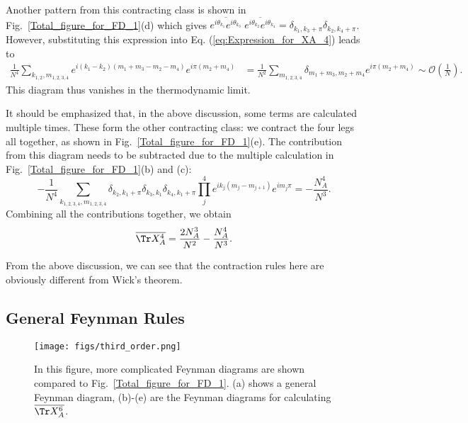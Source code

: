 Another pattern from this contracting class is shown in Fig.~\ref{Total_figure_for_FD_1}(d)
which gives $\overline{e^{i\theta_{k_{1}}}e^{i\theta_{k_{3}}}}\;\overline{e^{i\theta_{k_{2}}}e^{i\theta_{k_{4}}}}=\delta_{k_{1},k_{3}+\pi}\delta_{k_{2},k_{4}+\pi}$.
However, substituting this expression into Eq. (\ref{eq:Expression_for_XA_4})
leads to
\begin{equation}
\begin{aligned}\frac{1}{N^{4}}\sum_{k_{1,2},m_{1,2,3,4}}e^{i(k_{1}-k_{2})(m_{1}+m_{3}-m_{2}-m_{4})}e^{i\pi(m_{2}+m_{4})} & =\frac{1}{N^{2}}\sum_{m_{1,2,3,4}}\delta_{m_{1}+m_{3},m_{2}+m_{4}}e^{i\pi(m_{2}+m_{4})} \sim \mathcal{O}\left(\frac{1}{N}\right).
\end{aligned}
\end{equation}
This diagram thus %
vanishes in the thermodynamic limit. 

It should be emphasized that, in the above discussion, some terms %
are calculated multiple times.
These form the other contracting class: we contract the four legs
all together, as shown in Fig.~\ref{Total_figure_for_FD_1}(e). The
contribution from this diagram needs to be subtracted due to the multiple
calculation in Fig.~\ref{Total_figure_for_FD_1}(b) and (c):
\begin{equation}
-\frac{1}{N^{4}}\sum_{k_{1,2,3,4},m_{1,2,3,4}}\delta_{k_{2},k_{1}+\pi}\delta_{k_{3},k_{1}}\delta_{k_{4},k_{1}+\pi}\prod_{j}^{4}e^{ik_{j}(m_{j}-m_{j+1})}e^{im_{j}\pi}=-\frac{N_{A}^{4}}{N^{3}}.
\end{equation}
Combining all the contributions %
together, we obtain 
\begin{equation}
\overline{\Tr X_{A}^{4}}=\frac{2N_{A}^{3}}{N^{2}}-\frac{N_{A}^{4}}{N^{3}}.
\end{equation}

From the above discussion, we can see that the contraction rules here
are obviously different from %
Wick's theorem. 



\subsection{General Feynman Rules}

\begin{figure*}
\texttt{[image: figs/third\_order.png]}
\caption{In this figure, more complicated Feynman diagrams are shown compared %
to Fig.~\ref{Total_figure_for_FD_1}. (a) shows a general Feynman diagram,
(b)-(e) are the Feynman diagrams for calculating $\overline{\Tr X_{A}^{6}}$.}
\label{Total_figure_for_FD_2}
\end{figure*}

